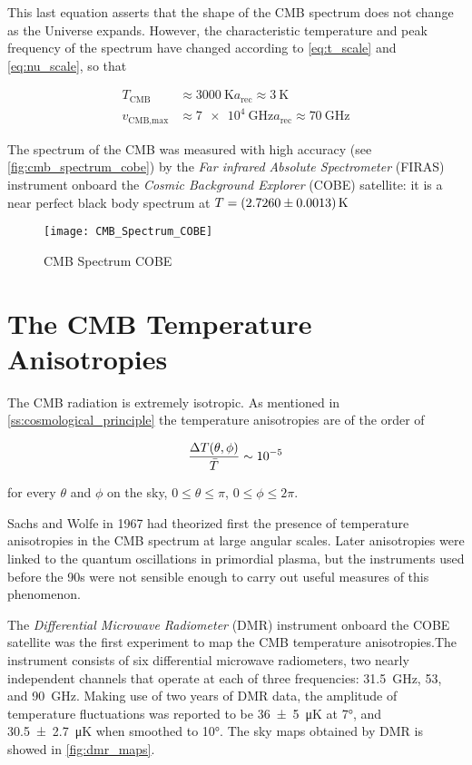 This last equation asserts that the shape of the CMB spectrum does not
change as the Universe expands. However, the characteristic temperature and
peak frequency of the spectrum have changed according to
\autoref{eq:t_scale} and \autoref{eq:nu_scale}, so that

\begin{align}
        T_{\text{CMB}} & \approx \SI{3000}{\kelvin} a_{\text{rec}} \approx
        \SI{3}{\kelvin} \\
        v_{\text{CMB,max}} & \approx \SI{7e4}{\giga\hertz} a_{\text{rec}}
        \approx \SI{70}{\giga\hertz}
\end{align}

The spectrum of the CMB was measured with high accuracy
(see \autoref{fig:cmb_spectrum_cobe})
by the \emph{Far infrared Absolute Spectrometer} (FIRAS) instrument onboard
the \emph{Cosmic Background Explorer} (COBE) satellite: it is a near
perfect black body spectrum at $T = \SI{2.7260 \pm 0.0013}{\kelvin}$

\begin{figure}
        \centering
        \texttt{[image: CMB\_Spectrum\_COBE]}
        \caption{CMB Spectrum COBE}
        \label{fig:cmb_spectrum_cobe}
\end{figure}

\section{The CMB Temperature Anisotropies}

The CMB radiation is extremely isotropic. As mentioned in
\autoref{ss:cosmological_principle} the temperature anisotropies are of the
order of

\begin{equation}
\frac{\Delta T\qty(\theta,\phi)}{\bar T} \sim \num{e-5}
\end{equation}

for every $\theta$ and $\phi$ on the sky, $0 \leq \theta \leq \pi$,
$0 \leq \phi \leq 2\pi$.

Sachs and Wolfe in 1967 had theorized first the presence of temperature
anisotropies in the CMB spectrum at large angular scales. Later
anisotropies were linked to the quantum oscillations in primordial plasma,
but the instruments used before the 90s were not sensible enough to carry
out useful measures of this phenomenon.

The \emph{Differential Microwave Radiometer} (DMR) instrument onboard the
COBE satellite was the first experiment to map the CMB temperature
anisotropies.The instrument consists of six differential microwave
radiometers, two nearly independent channels that operate at each of three
frequencies: \SI{ 31.5}{\giga\hertz}, \num{53}, and \SI{90}{\giga\hertz}.
Making use of two years of DMR data, the amplitude of temperature fluctuations
was reported to be
\SI{36 \pm 5}{\micro\kelvin} at \ang{7}, and
\SI{30.5 \pm 2.7}{\micro\kelvin} when smoothed to \ang{10}.
The sky maps obtained by DMR is showed in \autoref{fig:dmr_maps}.

